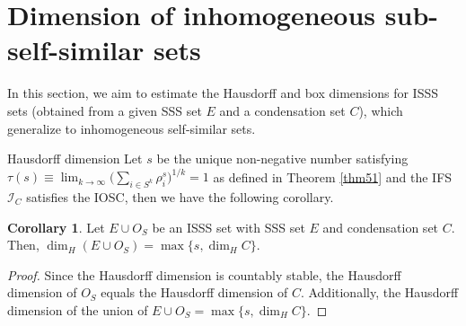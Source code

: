 \documentclass[12pt,oneside,reqno]{amsart}
\theoremstyle{definition}
\newtheorem{corollary}[theorem]{Corollary}
\theoremstyle{remark}
\begin{document}
\section{Dimension of inhomogeneous sub-self-similar sets}
In this section, we aim to estimate the Hausdorff and box dimensions for ISSS sets (obtained from a given SSS set $E$ and a condensation set $C$), which generalize to inhomogeneous self-similar sets. 
\begin{subsection}{Hausdorff dimension}
Let $s$ be the unique non-negative number satisfying $\tau(s) \equiv \lim_{k \to \infty} \bigg(\sum_{i \in S^k} \rho_i^s\bigg)^{1/k}=1$ as defined in Theorem \ref{thm51} and the IFS $\mathcal{I}_C$ satisfies the IOSC, then we have the following corollary.
\begin{corollary}
    Let $ E\cup O_S$ be an ISSS set with SSS set $E$ and condensation set $C.$ Then, $\dim_{H}(E\cup O_S) = \max \{s, \dim_H C\}$.
\end{corollary}
\begin{proof}
    Since the Hausdorff dimension is countably stable, the Hausdorff dimension of $O_S$ equals the Hausdorff dimension of $C$. Additionally, the Hausdorff dimension of the union of $E\cup O_S = \max \{s, \dim_H C\}$.
\end{proof}
\end{subsection}
\end{document}
